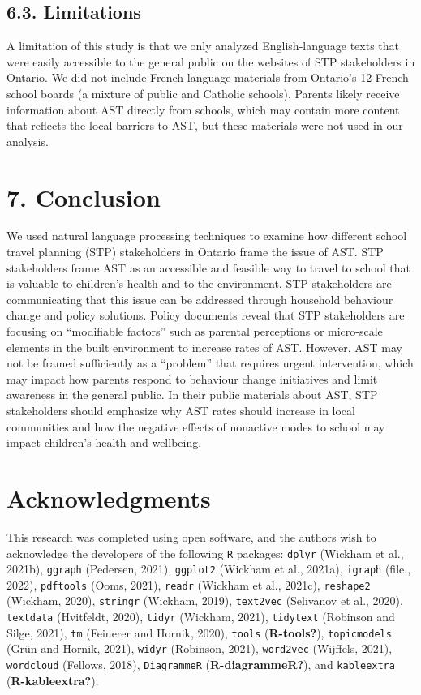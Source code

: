 \documentclass[]{elsarticle} %
\begin{document}
\hypertarget{limitations}{%
\subsection{6.3. Limitations}\label{limitations}}

A limitation of this study is that we only analyzed English-language
texts that were easily accessible to the general public on the websites
of STP stakeholders in Ontario. We did not include French-language
materials from Ontario's 12 French school boards (a mixture of public
and Catholic schools). Parents likely receive information about AST
directly from schools, which may contain more content that reflects the
local barriers to AST, but these materials were not used in our
analysis.

\hypertarget{conclusion}{%
\section{7. Conclusion}\label{conclusion}}

We used natural language processing techniques to examine how different
school travel planning (STP) stakeholders in Ontario frame the issue of
AST. STP stakeholders frame AST as an accessible and feasible way to
travel to school that is valuable to children's health and to the
environment. STP stakeholders are communicating that this issue can be
addressed through household behaviour change and policy solutions.
Policy documents reveal that STP stakeholders are focusing on
``modifiable factors'' such as parental perceptions or micro-scale
elements in the built environment to increase rates of AST. However, AST
may not be framed sufficiently as a ``problem'' that requires urgent
intervention, which may impact how parents respond to behaviour change
initiatives and limit awareness in the general public. In their public
materials about AST, STP stakeholders should emphasize why AST rates
should increase in local communities and how the negative effects of
nonactive modes to school may impact children's health and wellbeing.

\hypertarget{acknowledgments}{%
\section{Acknowledgments}\label{acknowledgments}}

This research was completed using open software, and the authors wish to
acknowledge the developers of the following \texttt{R} packages:
\texttt{dplyr} (Wickham et al., 2021b), \texttt{ggraph} (Pedersen,
2021), \texttt{ggplot2} (Wickham et al., 2021a), \texttt{igraph} (file.,
2022), \texttt{pdftools} (Ooms, 2021), \texttt{readr} (Wickham et al.,
2021c), \texttt{reshape2} (Wickham, 2020), \texttt{stringr} (Wickham,
2019), \texttt{text2vec} (Selivanov et al., 2020), \texttt{textdata}
(Hvitfeldt, 2020), \texttt{tidyr} (Wickham, 2021), \texttt{tidytext}
(Robinson and Silge, 2021), \texttt{tm} (Feinerer and Hornik, 2020),
\texttt{tools} (\textbf{R-tools?}), \texttt{topicmodels} (Grün and
Hornik, 2021), \texttt{widyr} (Robinson, 2021), \texttt{word2vec}
(Wijffels, 2021), \texttt{wordcloud} (Fellows, 2018),
\texttt{DiagrammeR} (\textbf{R-diagrammeR?}), and \texttt{kableextra}
(\textbf{R-kableextra?}).
\end{document}
